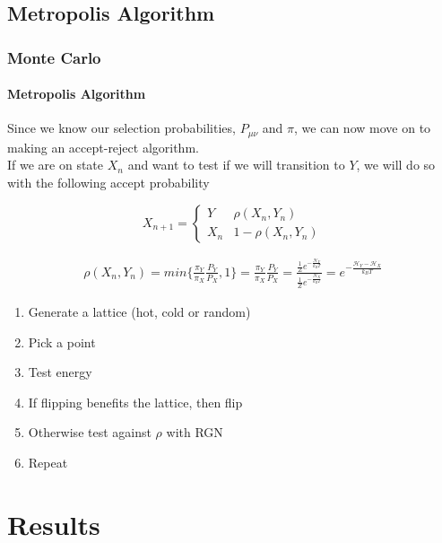 \documentclass[11pt,notes]{beamer}
\begin{document}
\subsection{Metropolis Algorithm}
\begin{frame}
\frametitle{Monte Carlo}
\framesubtitle{Metropolis Algorithm}
Since we know our selection probabilities, $P_{\mu\nu}$ and $ \pi $, we can now move on to making an accept-reject algorithm.\\
If we are on state $ X_n $ and want to test if we will transition to $ Y $, we will do so with the following accept probability

\begin{equation}
X_{n+1} = 
	\begin{cases}
		Y & \rho(X_n,Y_n) \\
		X_n & 1-\rho(X_n,Y_n)
	\end{cases}
\end{equation}

\begin{multline}
	\rho(X_n,Y_n) = 
	min\bigg\{\frac{\pi_Y}{\pi_X}\frac{P_Y}{P_X},1\bigg\} =
	\frac{\pi_Y}{\pi_X}\frac{P_Y}{P_X} = 
	\frac{\frac{1}{Z}e^{-\frac{\mathcal{H}_Y}{k_B T}}}{\frac{1}{Z}e^{-\frac{\mathcal{H}_X}{k_B T}}} =
	e^{-\frac{\mathcal{H}_Y - \mathcal{H}_X}{k_B T}}
\end{multline}

\end{frame}
\begin{frame}
\begin{enumerate}
	\item Generate a lattice (hot, cold or random)
	\item Pick a point
	\item Test energy
	\item If flipping benefits the lattice, then flip
	\item Otherwise test against $\rho$ with RGN
	\item Repeat
\end{enumerate}
\end{frame}
\section{Results}
\end{document}
